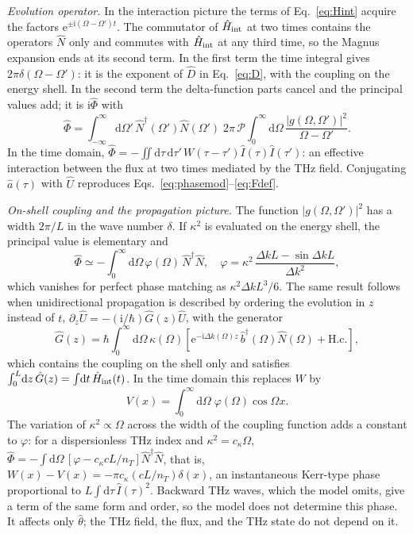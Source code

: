 \documentclass[aps,pra,reprint,superscriptaddress,amsmath,amssymb,floatfix]{revtex4-2}
\newcommand{\Nop}{\hat N}
\newcommand{\Iop}{\hat I}
\newcommand{\dd}{\mathrm{d}}
\newcommand{\ee}{\mathrm{e}}
\newcommand{\ii}{\mathrm{i}}
\begin{document}
\emph{Evolution operator.} In the interaction picture the terms of
Eq.~\eqref{eq:Hint} acquire the factors $\ee^{\pm\ii(\Omega-\Omega')t}$. The
commutator of $\hat H_{\rm int}$ at two times contains the operators $\Nop$
only and commutes with $\hat H_{\rm int}$ at any third time, so the Magnus
expansion ends at its second term. In the first term the time integral gives
$2\pi\delta(\Omega-\Omega')$: it is the exponent of $\hat D$ in
Eq.~\eqref{eq:D}, with the coupling on the energy shell. In the second term
the delta-function parts cancel and the principal values add; it is
$\ii\hat\Phi$ with
\begin{equation}
\hat\Phi=\!\int_{-\infty}^{\infty}\!\!\dd\Omega'\,\Nop^\dagger(\Omega')\Nop(\Omega')\;
2\pi\,\mathcal P\!\!\int_0^\infty\!\!\dd\Omega\,\frac{|g(\Omega,\Omega')|^2}{\Omega-\Omega'} .
\label{eq:Phi}
\end{equation}
In the time domain,
$\hat\Phi=-\iint\!\dd\tau\,\dd\tau'\,W(\tau-\tau')\Iop(\tau)\Iop(\tau')$: an
effective interaction between the flux at two times mediated by the THz
field. Conjugating $\hat a(\tau)$ with $\hat U$ reproduces
Eqs.~\eqref{eq:phasemod}--\eqref{eq:Fdef}.

\emph{On-shell coupling and the propagation picture.} The function
$|g(\Omega,\Omega')|^2$ has a width $2\pi/L$ in the wave number $\delta$. If
$\kappa^2$ is evaluated on the energy shell, the principal value is
elementary and
\begin{equation}
\hat\Phi\simeq-\!\int_0^\infty\!\!\dd\Omega\,\varphi(\Omega)\,\Nop^\dagger\Nop,
\quad
\varphi=\kappa^2\,\frac{\Delta kL-\sin\Delta kL}{\Delta k^2},
\label{eq:varphi}
\end{equation}
which vanishes for perfect phase matching as $\kappa^2\Delta kL^3/6$. The
same result follows when unidirectional propagation is described by ordering
the evolution in $z$ instead of $t$,
$\partial_z\hat U=-(\ii/\hbar)\hat G(z)\hat U$, with the generator
\begin{equation}
\hat G(z)=\hbar\!\int_0^\infty\!\!\dd\Omega\,\kappa(\Omega)
\left[\ee^{-\ii\Delta k(\Omega)z}\,\hat b^\dagger(\Omega)\Nop(\Omega)
+\mathrm{H.c.}\right],
\label{eq:G}
\end{equation}
which contains the coupling on the shell only and satisfies
$\int_0^L\!\dd z\,\hat G(z)=\int\!\dd t\,\hat H_{\rm int}(t)$. In the time
domain this replaces $W$ by
\begin{equation}
V(x)=\int_0^\infty\!\!\dd\Omega\;\varphi(\Omega)\cos\Omega x .
\label{eq:V}
\end{equation}
The variation of $\kappa^2\propto\Omega$ across the width of the coupling
function adds a constant to $\varphi$: for a dispersionless THz index and
$\kappa^2=c_\kappa\Omega$,
$\hat\Phi=-\int\!\dd\Omega\,[\varphi-c_\kappa cL/n_T]\Nop^\dagger\Nop$, that
is, $W(x)-V(x)=-\pi c_\kappa(cL/n_T)\delta(x)$, an instantaneous Kerr-type
phase proportional to $L\int\!\dd\tau\,\Iop(\tau)^2$. Backward THz waves,
which the model omits, give a term of the same form and order, so the model
does not determine this phase. It affects only $\hat\theta$; the THz field,
the flux, and the THz state do not depend on it.
\end{document}

